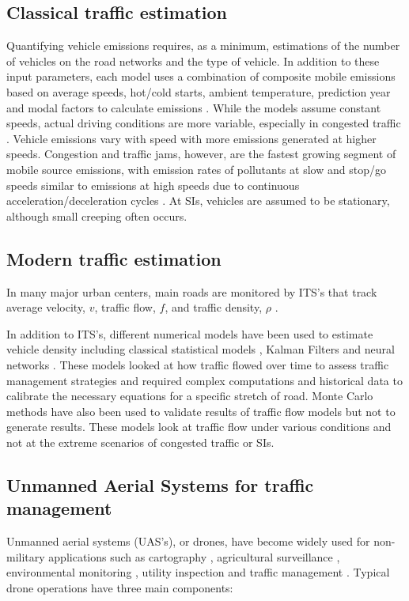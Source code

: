 \subsection{Classical traffic estimation} \label{sssec:ClassicalTraffic}

Quantifying vehicle emissions requires, as a minimum, estimations of the number of vehicles on the road networks and the type of vehicle. In addition to these input parameters, each model uses a combination of composite mobile emissions based on average speeds, hot/cold starts, ambient temperature, prediction year and modal factors to calculate emissions \citep{Franco2013}. While the models assume constant speeds, actual driving conditions are more variable, especially in congested traffic \citep{Freeman2015b}. Vehicle emissions vary with speed with more emissions generated at higher speeds. Congestion and traffic jams, however, are the fastest growing segment of mobile source emissions, with emission rates of pollutants at slow and stop/go speeds similar to emissions at high speeds due to continuous acceleration/deceleration cycles \citep{Barth2009}. At SIs, vehicles are assumed to be stationary, although small creeping often occurs.

\subsection{Modern traffic estimation}

In many major urban centers, main roads are monitored by ITS's that track average velocity, $v$, traffic flow, $f$, and traffic density, $\rho$ \citep{Wu2007, Abtahi2011, Bartosz2015}.

In addition to ITS's, different numerical models have been used to estimate vehicle density including classical statistical models \citep{Schreckenberg1995}, Kalman Filters \citep{Pourmoallem1997, Sun2004} and neural networks \citep{Ghosh-Dastidar2006}.  These models looked at how traffic flowed over time to assess traffic management strategies and required complex computations and historical data to calibrate the necessary equations for a specific stretch of road.  Monte Carlo methods have also been used to validate results of traffic flow models \citep{Mihaylova2004} but not to generate results.  These models look at traffic flow under various conditions and not at the extreme scenarios of congested traffic or SIs. 

\subsection{Unmanned Aerial Systems for traffic management} 
Unmanned aerial systems (UAS's), or drones, have become widely used for non-military applications such as cartography \citep{Saadatseresht2015}, agricultural surveillance \citep{Saari2017}, environmental monitoring \citep{Capolupo2015, Rees2018}, utility inspection \citep{Day2017, Gomez2017} and traffic management \citep{Ke2018, Ahmadi2017,  Salvo2017, Liu2013}.  Typical drone operations have three main components:

